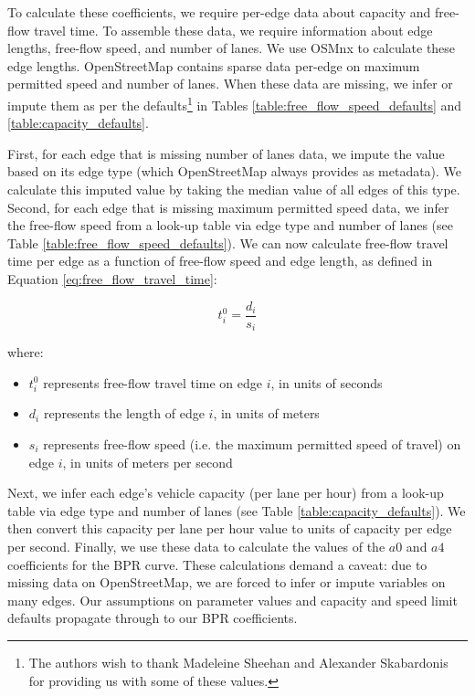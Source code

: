 To calculate these coefficients, we require per-edge data about capacity and free-flow travel time. To assemble these data, we require information about edge lengths, free-flow speed, and number of lanes. We use OSMnx to calculate these edge lengths. OpenStreetMap contains sparse data per-edge on maximum permitted speed and number of lanes. When these data are missing, we infer or impute them as per the defaults\footnote{The authors wish to thank Madeleine Sheehan and Alexander Skabardonis for providing us with some of these values.} in Tables \ref{table:free_flow_speed_defaults} and \ref{table:capacity_defaults}.

First, for each edge that is missing number of lanes data, we impute the value based on its edge type (which OpenStreetMap always provides as metadata). We calculate this imputed value by taking the median value of all edges of this type. Second, for each edge that is missing maximum permitted speed data, we infer the free-flow speed from a look-up table via edge type and number of lanes (see Table \ref{table:free_flow_speed_defaults}). We can now calculate free-flow travel time per edge as a function of free-flow speed and edge length, as defined in Equation \ref{eq:free_flow_travel_time}:

\begin{equation}
    t^0_i = \frac{d_i}{s_i}
    \label{eq:free_flow_travel_time}
\end{equation}

where:

\begin{itemize}
    \item $t^0_i$ represents free-flow travel time on edge $i$, in units of seconds
    \item $d_i$ represents the length of edge $i$, in units of meters
    \item $s_i$ represents free-flow speed (i.e. the maximum permitted speed of travel) on edge $i$, in units of meters per second
\end{itemize}

Next, we infer each edge's vehicle capacity (per lane per hour) from a look-up table via edge type and number of lanes (see Table \ref{table:capacity_defaults}). We then convert this capacity per lane per hour value to units of capacity per edge per second. Finally, we use these data to calculate the values of the $a0$ and $a4$ coefficients for the BPR curve. These calculations demand a caveat: due to missing data on OpenStreetMap, we are forced to infer or impute variables on many edges. Our assumptions on parameter values and capacity and speed limit defaults propagate through to our BPR coefficients.

